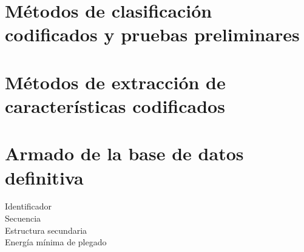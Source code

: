 \documentclass[12pt,bibliography=openstyle,DIV=12,parskip=half-]{scrartcl}
\begin{document}
\section{Métodos de clasificación codificados y pruebas preliminares}
\section{Métodos de extracción de características codificados}
\section{Armado de la base de datos definitiva}
\begin{description}
\item[Identificador] 
\item[Secuencia] 
\item[Estructura secundaria] 
\item[Energía mínima de plegado] 
\item[] 
\item[] 
\item[] 
\item[] 
\item[] 
\item[] 
\item[] 
\item[] 
\item[] 
\item[] 
\item[] 
\item[] 
\item[] 
\item[] 
\item[] 
\item[] 
\item[] 
\item[] 
\item[] 
\item[] 
\item[] 
\item[] 
\item[] 
\item[] 
\item[] 
\item[] 
\item[] 
\item[] 
\item[] 
\item[] 
\item[] 
\item[] 
\item[] 

\end{description}
\end{document}
